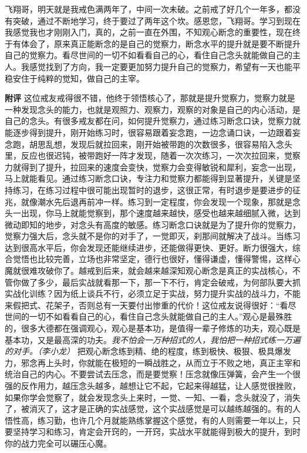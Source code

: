 \begin{case}
    飞翔哥，明天就是我戒色满两年了，中间一次未破。之前戒了好几个一年多，都没有突破，通过不断地学习，终于要过了两年这个坎。感恩您，飞翔哥。学习到现在我感觉我也才刚刚入门，真的，之前一直在外围，不知观心断念的重要性，现在终于有体会了，原来真正能断念的是自己的觉察力，断念水平的提升就是要不断提升自己的觉察力。看尽世间的一切不如看看自己的心，看住自己念头就能做自己的主人。我感觉找到了方向，我一定要更加努力提升自己的觉察力，希望有一天也能平稳安住于纯粹的觉知，做自己的主宰。

    \textbf{附评} 这位戒友戒得很不错，他终于领悟核心了，那就是提升觉察力，觉察力就是一种发现念头的能力，也就是观照力、观察力，观察的对象是自己的内心活动，是自己的念头。有很多戒友都在问，如何提升觉察力，通过练习断念口诀，觉察力就能逐步得到提升，刚开始练习时，很容易跟着妄念跑，一边念诵口诀，一边跟着妄念跑，胡思乱想，发现后就拉回来，刚开始被带跑的次数很多，很容易陷入念头里，反应也很迟钝，被带跑好一阵才发现，随着一次次练习，一次次拉回来，觉察力就得到了提升，拉回来的速度会变快，觉察力会变得敏锐和犀利，妄念一出现，马上就能看见。通过练习断念口诀，专注力和觉察力都能得到显著提升，关键是坚持练习，在练习过程中很可能出现暂时的退步，这很正常，有时退步是要进步的征兆，就像潮水先后退再前冲一样。练习到一定程度，你会发现一个现象，那就是念头一出现，你马上就能觉察到，那个速度越来越快，感受也越来越细腻入微，达到微动即知的地步，对念头有高度的敏感。练习断念口诀就是为了提升你的觉察力，觉察力强大后，念头就不是你的对手了，一觉即灭，刹那间就解决了战斗。当练习达到很高水平后，你会发现还能继续进步，还能做得更快、更好。断力很强大，综合觉悟也比较完善，立场也非常坚定，德行也很好，懂得谦虚，懂得警惕，这样心魔就很难攻破你了。越戒到后来，就会越来越深知观心断念是真正的实战核心，不管你做了多少，最后实战就看那一下，那一下不行，肯定会破戒，为何部队要大抓实战化训练？因为纸上谈兵不行，必须立足于实战，努力提升实战的战斗力，不能来假把式、花架子，否则总有一天要付出惨重的代价！这位戒友说得很好：“看尽世间的一切不如看看自己的心，看住自己念头就能做自己的主人。”观心是最殊胜的，很多大德都在强调观心，观心是基本功，是值得一辈子修炼的功夫，观心既是基本功，又是最高深的功夫。\textit{我不怕会一万种招式的人，我怕把一种招式练一万遍的对手。（李小龙）} 把观心断念练到精、绝的程度，练到极快、极狠、极具爆发力，邪念再上头时，你就能在极短的一瞬战胜之，从而立于不败之地，真正主宰和统治自己的内心。不要尝试去压念，而是要觉察！压念就像压弹簧，会产生一个很强的反作用力，越压念头越多，越想让它不起，它起来得越猛，让人感觉很挫败，如果你学会觉察了，就会发现念头上来时，一觉、一知、一看，念头就没了，消失了，被消灭了，这才是正确的实战感觉，这个实战感觉是可以越练越强的。有的人悟性高，练习勤，也许几个月就能熟练掌握这个感觉，有的人则需要一年以上，只要坚持学习和练习，肯定会开窍的，一开窍，实战水平就能得到极大的提升，到时你的战力完全可以碾压心魔。
\end{case}

